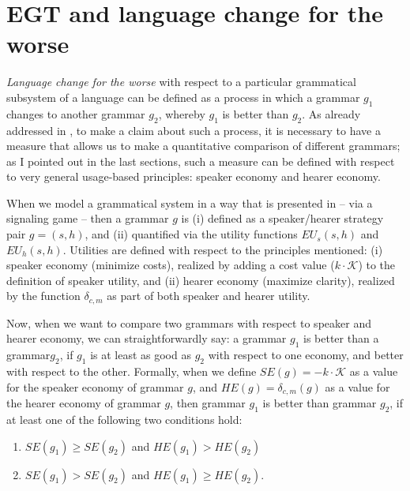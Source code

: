 \documentclass[output=paper,hidelinks]{langscibook}
\begin{document}
\section{EGT and language change for the worse}
\label{sec:discussion}

\emph{Language change for the worse} with respect to a particular grammatical subsystem of a language can be defined as a process in which a grammar $g_1$ changes to another grammar $g_2$, whereby $g_1$ is better than $g_2$.
As already addressed in , 
to make a claim about such a process, 
it is  necessary to have a measure that allows us to make a quantitative comparison of different grammars; as I pointed out in the last sections, such a measure can be defined with respect to very general usage-based principles: speaker economy and hearer economy. 

When we model a grammatical system in a way that is presented in  -- via a signaling game -- then a grammar $g$ is (i) defined as a speak\-er/hear\-er strategy pair $g= (s,h)$, and (ii) quantified via the utility functions $EU_s(s,h)$ and $EU_h(s,h)$. Utilities are defined with respect to the principles mentioned: (i) speaker economy (minimize costs), realized by adding a cost value ($k \cdot \mathcal{K}$) to the definition of speaker utility, and (ii) hearer economy (maximize clarity), realized by the function $\delta_{c,m}$ as part of both speaker and hearer utility. 

Now, when we want to compare two grammars with respect to speaker and hearer economy, we can straightforwardly say: a grammar $g_1$ is better than a grammar$g_2$, if $g_1$ is at least as good as $g_2$ with respect to one economy, and better with respect to the other.
Formally,  when we  define $SE(g) = -k \cdot \mathcal{K}$ as a value for the speaker economy of grammar $g$, and $HE(g) =  \delta_{c,m}(g)$ as a value for the hearer economy of grammar $g$, then grammar $g_1$ is better than grammar $g_2$, if at least one of the following two conditions hold:

\begin{enumerate}
\item $SE(g_1) \geq SE(g_2)$ and $HE(g_1) > HE(g_2)$
\item $SE(g_1) > SE(g_2)$ and $HE(g_1) \geq HE(g_2)$.
\end{enumerate}
\end{document}
